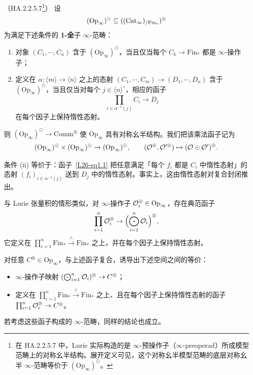 \begin{theoremdef}\label{L26-1.10}（HA.2.2.5.7\footnote{在 HA.2.2.5.7 中，Lurie 实际构造的是 $\infty$-预操作子（$\infty$-preoperad）所成模型范畴上的对称幺半结构。展开定义可见，这个对称幺半模型范畴的底层对称幺半 $\infty$-范畴等价于 $(\mathrm{Op}_{\infty})^{\odot}$。}）
设
\[
(\mathrm{Op}_{\infty})^{\odot}\subseteq((\operatorname{Cat}_{\infty})_{/\mathrm{Fin}_{*}})^{\otimes}
\]
为满足下述条件的 \textbf{1-全}子 $\infty$-范畴：
\begin{enumerate}[label=(\roman*),leftmargin=2.4em,itemsep=0.1em]
\item 对象 $(C_{1},\cdots,C_{n})$ 含于 $(\mathrm{Op}_{\infty})^{\odot}$，当且仅当每个 $C_{k}\to\mathrm{Fin}_{*}$ 都是 $\infty$-操作子；
\item 定义在 $\alpha\colon\langle m\rangle\to\langle n\rangle$ 之上的态射 $(C_{1},\cdots,C_{m})\to(D_{1},\cdots,D_{n})$ 含于 $(\mathrm{Op}_{\infty})^{\odot}$，当且仅当对每个 $j\in\langle n\rangle^{\circ}$，相应的函子
\begin{equation}\label{L26-eq1.1}
\prod_{i\in\alpha^{-1}(j)}C_{i}\to D_{j}
\end{equation}
在每个因子上保持惰性态射。
\end{enumerate}
则 $(\mathrm{Op}_{\infty})^{\odot}\to\mathrm{Comm}^{\otimes}$ 使 $\mathrm{Op}_{\infty}$ 具有对称幺半结构。我们把该乘法函子记为
\[
(\mathrm{Op}_{\infty})^{\odot}\times(\mathrm{Op}_{\infty})^{\odot}\to(\mathrm{Op}_{\infty})^{\odot},\qquad
(\mathcal{O}^{\otimes},\mathcal{O}^{\prime\otimes})\mapsto(\mathcal{O}\odot\mathcal{O}^{\prime})^{\otimes}.
\]
\end{theoremdef}

\begin{remark}\label{L26-1.11}
条件 (ii) 等价于：函子~\eqref{L26-eq1.1} 把任意满足「每个 $f_{i}$ 都是 $C_{i}$ 中惰性态射」的态射 $(f_{i})_{i\in\alpha^{-1}(j)}$ 送到 $D_{j}$ 中的惰性态射。事实上，这由惰性态射对复合封闭推出。
\end{remark}

\nitem\label{L26-1.12} 与 Lurie 张量积的情形类似，对 $\infty$-操作子 $\mathcal{O}_{i}^{\otimes}\in\mathrm{Op}_{\infty}$，存在典范函子
\[
\prod_{i=1}^{n}\mathcal{O}_{i}^{\otimes}\to\Bigl(\bigodot_{i=1}^{n}\mathcal{O}_{i}\Bigr)^{\otimes},
\]
它定义在 $\prod_{i=1}^{n}\mathrm{Fin}_{*}\xrightarrow{\wedge}\mathrm{Fin}_{*}$ 之上，并在每个因子上保持惰性态射。

\begin{exercise}\label{L26-1.13}
对任意 $C^{\otimes}\in\mathrm{Op}_{\infty}$，与上述函子复合，诱导出下述空间之间的等价：
\begin{itemize}[leftmargin=2.2em,itemsep=0.1em]
\item $\infty$-操作子映射 $(\bigodot_{i=1}^{n}\mathcal{O}_{i})^{\otimes}\to C^{\otimes}$；
\item 定义在 $\prod_{i=1}^{n}\mathrm{Fin}_{*}\xrightarrow{\wedge}\mathrm{Fin}_{*}$ 之上、且在每个因子上保持惰性态射的函子 $\prod_{i=1}^{n}\mathcal{O}_{i}^{\otimes}\to C^{\otimes}$。
\end{itemize}
若考虑这些函子构成的 $\infty$-范畴，同样的结论也成立。
\end{exercise}

